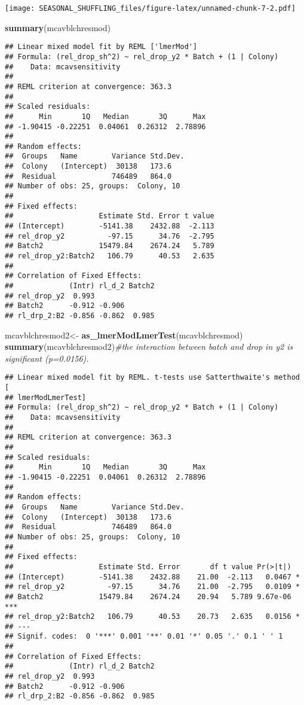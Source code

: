 \documentclass[]{article}
\newenvironment{Shaded}{\begin{snugshade}}{\end{snugshade}}
\newcommand{\CommentTok}[1]{\textcolor[rgb]{0.56,0.35,0.01}{\textit{#1}}}
\newcommand{\KeywordTok}[1]{\textcolor[rgb]{0.13,0.29,0.53}{\textbf{#1}}}
\newcommand{\NormalTok}[1]{#1}
\newcommand{\StringTok}[1]{\textcolor[rgb]{0.31,0.60,0.02}{#1}}
\begin{document}
\texttt{[image: SEASONAL\_SHUFFLING\_files/figure-latex/unnamed-chunk-7-2.pdf]}

\begin{Shaded}
\begin{Highlighting}[]
\KeywordTok{summary}\NormalTok{(mcavblchresmod)}
\end{Highlighting}
\end{Shaded}

\begin{verbatim}
## Linear mixed model fit by REML ['lmerMod']
## Formula: (rel_drop_sh^2) ~ rel_drop_y2 * Batch + (1 | Colony)
##    Data: mcavsensitivity
## 
## REML criterion at convergence: 363.3
## 
## Scaled residuals: 
##      Min       1Q   Median       3Q      Max 
## -1.90415 -0.22251  0.04061  0.26312  2.78896 
## 
## Random effects:
##  Groups   Name        Variance Std.Dev.
##  Colony   (Intercept)  30138   173.6   
##  Residual             746489   864.0   
## Number of obs: 25, groups:  Colony, 10
## 
## Fixed effects:
##                    Estimate Std. Error t value
## (Intercept)        -5141.38    2432.88  -2.113
## rel_drop_y2          -97.15      34.76  -2.795
## Batch2             15479.84    2674.24   5.789
## rel_drop_y2:Batch2   106.79      40.53   2.635
## 
## Correlation of Fixed Effects:
##             (Intr) rl_d_2 Batch2
## rel_drop_y2  0.993              
## Batch2      -0.912 -0.906       
## rl_drp_2:B2 -0.856 -0.862  0.985
\end{verbatim}

\begin{Shaded}
\begin{Highlighting}[]
\NormalTok{mcavblchresmod2<-}\StringTok{ }\KeywordTok{as_lmerModLmerTest}\NormalTok{(mcavblchresmod)}
\KeywordTok{summary}\NormalTok{(mcavblchresmod2)}\CommentTok{#the interaction between batch and drop in y2 is significant (p=0.0156).}
\end{Highlighting}
\end{Shaded}

\begin{verbatim}
## Linear mixed model fit by REML. t-tests use Satterthwaite's method [
## lmerModLmerTest]
## Formula: (rel_drop_sh^2) ~ rel_drop_y2 * Batch + (1 | Colony)
##    Data: mcavsensitivity
## 
## REML criterion at convergence: 363.3
## 
## Scaled residuals: 
##      Min       1Q   Median       3Q      Max 
## -1.90415 -0.22251  0.04061  0.26312  2.78896 
## 
## Random effects:
##  Groups   Name        Variance Std.Dev.
##  Colony   (Intercept)  30138   173.6   
##  Residual             746489   864.0   
## Number of obs: 25, groups:  Colony, 10
## 
## Fixed effects:
##                    Estimate Std. Error       df t value Pr(>|t|)    
## (Intercept)        -5141.38    2432.88    21.00  -2.113   0.0467 *  
## rel_drop_y2          -97.15      34.76    21.00  -2.795   0.0109 *  
## Batch2             15479.84    2674.24    20.94   5.789 9.67e-06 ***
## rel_drop_y2:Batch2   106.79      40.53    20.73   2.635   0.0156 *  
## ---
## Signif. codes:  0 '***' 0.001 '**' 0.01 '*' 0.05 '.' 0.1 ' ' 1
## 
## Correlation of Fixed Effects:
##             (Intr) rl_d_2 Batch2
## rel_drop_y2  0.993              
## Batch2      -0.912 -0.906       
## rl_drp_2:B2 -0.856 -0.862  0.985
\end{verbatim}
\end{document}
